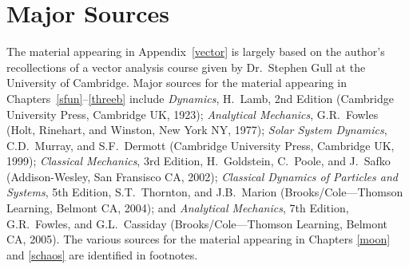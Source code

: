 \section{Major Sources}
The material appearing in Appendix~\ref{vector} is largely based on the author's recollections
of a vector analysis course given by Dr.~Stephen Gull at the University
of Cambridge. Major sources for the material appearing in Chapters~\ref{sfun}--\ref{threeb}
include  
{\em Dynamics}, H.~Lamb, 2nd Edition (Cambridge University Press, Cambridge UK, 1923);
{\em Analytical Mechanics}, G.R.~Fowles (Holt, Rinehart, and Winston,
New York NY, 1977); 
{\em Solar System Dynamics}, C.D.~Murray, and S.F.~Dermott (Cambridge University Press,
Cambridge UK, 1999);
{\em Classical Mechanics}, 3rd Edition, H.~Goldstein, C.~Poole, and J.~Safko (Addison-Wesley,
San Fransisco CA, 2002);
{\em Classical Dynamics of Particles and Systems}, 5th Edition, S.T.~Thornton, and
 J.B.~Marion (Brooks/Cole---Thomson Learning, Belmont CA, 2004); and
{\em Analytical Mechanics}, 7th Edition,  G.R.~Fowles, and G.L.~Cassiday
(Brooks/Cole---Thomson Learning, Belmont CA, 2005). The various sources for
the material appearing in Chapters \ref{moon} and \ref{schaos} are identified in footnotes.

